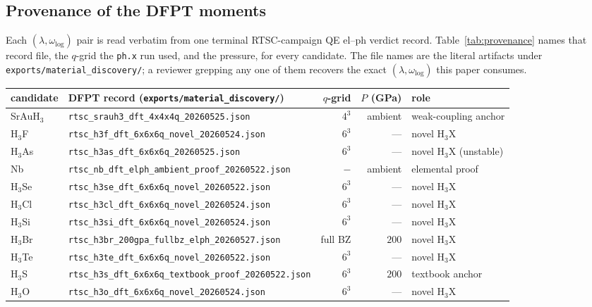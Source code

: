 \documentclass[11pt,a4paper]{article}
\begin{document}
\subsection{Provenance of the DFPT moments}
\label{app:provenance}

Each $(\lambda,\omega_{\log})$ pair is read verbatim from one terminal RTSC-campaign
QE el--ph verdict record. Table~\ref{tab:provenance} names that record file, the
$q$-grid the \texttt{ph.x} run used, and the pressure, for every candidate. The
file names are the literal artifacts under
\texttt{exports/material\_discovery/}; a reviewer grepping any one of them
recovers the exact $(\lambda,\omega_{\log})$ this paper consumes.

\begin{table}[h]
\centering
\small
\setlength{\tabcolsep}{4pt}
\begin{tabular}{llrrl}
\toprule
\textbf{candidate} & \textbf{DFPT record (\texttt{exports/material\_discovery/})}
  & $q$-grid & \textbf{$P$ (GPa)} & \textbf{role} \\
\midrule
SrAuH$_3$ & \texttt{rtsc\_srauh3\_dft\_4x4x4q\_20260525.json}        & $4^3$ & ambient & weak-coupling anchor \\
H$_3$F    & \texttt{rtsc\_h3f\_dft\_6x6x6q\_novel\_20260524.json}     & $6^3$ & ---     & novel H$_3$X \\
H$_3$As   & \texttt{rtsc\_h3as\_dft\_6x6x6q\_20260525.json}           & $6^3$ & ---     & novel H$_3$X (unstable) \\
Nb        & \texttt{rtsc\_nb\_dft\_elph\_ambient\_proof\_20260522.json} & $-$ & ambient & elemental proof \\
H$_3$Se   & \texttt{rtsc\_h3se\_dft\_6x6x6q\_novel\_20260522.json}    & $6^3$ & ---     & novel H$_3$X \\
H$_3$Cl   & \texttt{rtsc\_h3cl\_dft\_6x6x6q\_novel\_20260524.json}    & $6^3$ & ---     & novel H$_3$X \\
H$_3$Si   & \texttt{rtsc\_h3si\_dft\_6x6x6q\_novel\_20260524.json}    & $6^3$ & ---     & novel H$_3$X \\
H$_3$Br   & \texttt{rtsc\_h3br\_200gpa\_fullbz\_elph\_20260527.json}  & full BZ & $200$ & novel H$_3$X \\
H$_3$Te   & \texttt{rtsc\_h3te\_dft\_6x6x6q\_novel\_20260522.json}    & $6^3$ & ---     & novel H$_3$X \\
H$_3$S    & \texttt{rtsc\_h3s\_dft\_6x6x6q\_textbook\_proof\_20260522.json} & $6^3$ & $200$ & textbook anchor \\
H$_3$O    & \texttt{rtsc\_h3o\_dft\_6x6x6q\_novel\_20260524.json}     & $6^3$ & ---     & novel H$_3$X \\

\end{tabular}
\end{table}
\end{document}
